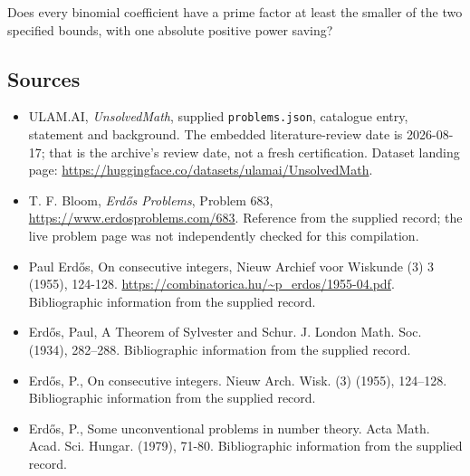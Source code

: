 \documentclass[11pt,a4paper]{article}
\begin{document}
Does every binomial coefficient have a prime factor at least the smaller of the two specified bounds, with one absolute positive power saving?

\subsection{Sources}

{\small

\begin{itemize}

\item[\hypertarget{source:statement:1}{S1}] ULAM.AI, \emph{UnsolvedMath}, supplied \texttt{problems.json}, catalogue entry, statement and background. The embedded literature-review date is 2026-08-17; that is the archive’s review date, not a fresh certification. Dataset landing page: \url{https://huggingface.co/datasets/ulamai/UnsolvedMath}.

\item[\hypertarget{source:statement:2}{S2}] T. F. Bloom, \emph{Erdős Problems}, Problem 683, \url{https://www.erdosproblems.com/683}. Reference from the supplied record; the live problem page was not independently checked for this compilation.

\item[\hypertarget{source:statement:3}{S3}] Paul Erdős, On consecutive integers, Nieuw Archief voor Wiskunde (3) 3 (1955), 124-128. \url{https://combinatorica.hu/~p_erdos/1955-04.pdf}. Bibliographic information from the supplied record.

\item[\hypertarget{source:statement:4}{S4}] Erd\H{o}s, Paul, A {T}heorem of {S}ylvester and {S}chur. J. London Math. Soc. (1934), 282--288. Bibliographic information from the supplied record.

\item[\hypertarget{source:statement:5}{S5}] Erd\H{o}s, P., On consecutive integers. Nieuw Arch. Wisk. (3) (1955), 124--128. Bibliographic information from the supplied record.

\item[\hypertarget{source:statement:6}{S6}] Erd\H{o}s, P., Some unconventional problems in number theory. Acta Math. Acad. Sci. Hungar. (1979), 71-80. Bibliographic information from the supplied record.

\end{itemize}

}

\label{end:statement}
\end{document}
